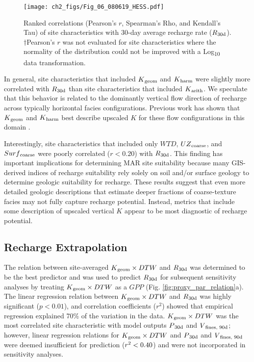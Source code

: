 \begin{figure}[t]
\centering
\texttt{[image: ch2\_figs/Fig\_06\_080619\_HESS.pdf]}
\caption{Ranked correlations (Pearson's $r$, Spearman's Rho, and Kendall's Tau) of site characteristics with 30-day average recharge rate ($R\textsubscript{30d}$). $\dagger$Pearson's $r$ was not evaluated for site characteristics where the normality of the distribution could not be improved with a Log\textsubscript{10} data transformation.}
\label{fig:correlations_ranked}
\end{figure} 
 
In general, site characteristics that included $K\textsubscript{geom}$ and $K\textsubscript{harm}$ were slightly more correlated with $R\textsubscript{30d}$ than site characteristics that included $K\textsubscript{arith}$. We speculate that this behavior is related to the dominantly vertical flow direction of recharge across typically horizontal facies configurations. Previous work has shown that $K\textsubscript{geom}$ and $K\textsubscript{harm}$ best describe upscaled $K$ for these flow configurations in this domain \citep[Yunjie Liu, personal communication;][]{fogg1986groundwater}.
 
Interestingly, site characteristics that included only $WTD$, $UZ\textsubscript{coarse}$, and $Surf\textsubscript{coarse}$ were poorly correlated ($r < 0.20$) with $R\textsubscript{30d}$. This finding has important implications for determining MAR site suitability because many GIS-derived indices of recharge suitability rely solely on soil and/or surface geology to determine geologic suitability for recharge. These results suggest that even more detailed geologic descriptions that estimate deeper fractions of coarse-texture facies may not fully capture recharge potential. Instead, metrics that include some description of upscaled vertical $K$ appear to be most diagnostic of recharge potential.

\subsection{Recharge Extrapolation} \label{ssec:R_rech_extrapolation}

The relation between site-averaged $K\textsubscript{geom}\times DTW$ and $R\textsubscript{30d}$ was determined to be the best predictor and was used to predict $R\textsubscript{30d}$ for subsequent sensitivity analyses by treating $K\textsubscript{geom}\times DTW$ as a $GPP$ (Fig. \ref{fig:proxy_par_relation}a). The linear regression relation between $K\textsubscript{geom}\times DTW$ and $R\textsubscript{30d}$ was highly significant ($p < 0.01$), and correlation coefficients ($r^2$) showed that empirical regression explained 70\% of the variation in the data. $K\textsubscript{geom}\times DTW$ was the most correlated site characteristic with model outputs $P\textsubscript{30d}$ and $V\textsubscript{fines, 90d}$; however, linear regression relations for $K\textsubscript{geom}\times DTW$ and $P\textsubscript{30d}$ and $V\textsubscript{fines, 90d}$ were deemed insufficient for prediction  ($r\textsuperscript{2}< 0.40$) and were not incorporated in sensitivity analyses.


